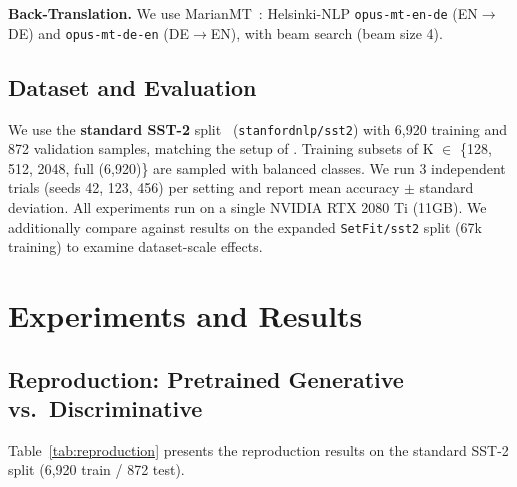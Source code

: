 \documentclass[11pt,a4paper,twocolumn]{article}
\begin{document}
\textbf{Back-Translation.} We use MarianMT~\cite{junczys2018}: Helsinki-NLP \texttt{opus-mt-en-de} (EN$\rightarrow$DE) and \texttt{opus-mt-de-en} (DE$\rightarrow$EN), with beam search (beam size 4).

\subsection{Dataset and Evaluation}

We use the \textbf{standard SST-2} split~\cite{socher2013} (\texttt{stanfordnlp/sst2}) with 6,920 training and 872 validation samples, matching the setup of \cite{kasa2025}. Training subsets of K $\in$ \{128, 512, 2048, full (6,920)\} are sampled with balanced classes. We run 3 independent trials (seeds 42, 123, 456) per setting and report mean accuracy $\pm$ standard deviation. All experiments run on a single NVIDIA RTX 2080 Ti (11GB). We additionally compare against results on the expanded \texttt{SetFit/sst2} split (67k training) to examine dataset-scale effects.

\section{Experiments and Results}

\subsection{Reproduction: Pretrained Generative vs.\ Discriminative}

Table~\ref{tab:reproduction} presents the reproduction results on the standard SST-2 split (6,920 train / 872 test).

\begin{table}[H]
\centering
\small
{}
\caption{Reproduction: mean accuracy (\%) $\pm$ std.\ (3 seeds) on standard SST-2 with pretrained models. BERT dominates GPT-2 at all data scales (+27--39\%). No generative--discriminative cross-over is observed.}
\label{tab:reproduction}
\end{table}
\end{document}
